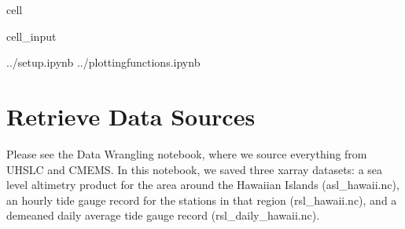 \documentclass[letterpaper,10pt,english]{jupyterBook}
\begin{document}
\begin{sphinxuseclass}{cell}\begin{sphinxVerbatimInput}

\begin{sphinxuseclass}{cell_input}
\begin{sphinxVerbatim}[commandchars=\\\{\}]
 ../setup.ipynb  
 ../plotting\PYGZus{}functions.ipynb
   
   
\end{sphinxVerbatim}

\end{sphinxuseclass}\end{sphinxVerbatimInput}

\end{sphinxuseclass}

\part{Retrieve Data Sources}
\label{\detokenize{notebooks/regional_and_local/SL_Trend:retrieve-data-sources}}
\sphinxAtStartPar
Please see the Data Wrangling notebook, where we source everything from UHSLC and CMEMS. In this notebook, we saved three xarray datasets: a sea level altimetry product for the area around the Hawaiian Islands (asl\_hawaii.nc), an hourly tide gauge record for the stations in that region (rsl\_hawaii.nc), and a de\sphinxhyphen{}meaned daily average tide gauge record (rsl\_daily\_hawaii.nc).
\end{document}
